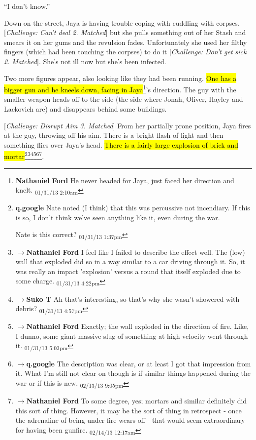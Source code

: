 ``I don't know.''



Down on the street, Jaya is having trouble coping with cuddling with corpses. {[}\textit{Challenge: Can't deal 2.  Matched}{]} but she pulls something out of her Stash and smears it on her gums and the revulsion fades.  Unfortunately she used her filthy fingers (which had been touching the corpses) to do it {[}\textit{Challenge: Don't get sick 2. }\textit{Matched}{]}.  She's not ill now but she's been infected.



Two more figures appear, also looking like they had been running.  \hl{One has a bigger gun and he kneels down, facing in Jaya}\footnote{\textbf{Nathaniel Ford }He never headed for Jaya, just faced her direction and knelt. \textsubscript{01/31/13 2:10am}}'s direction.  The guy with the smaller weapon heads off to the side (the side where Jonah, Oliver, Hayley and Lackovich are) and disappears behind some buildings.



{[}\textit{Challenge: Disrupt Aim 3. Matched}{]} From her partially prone position, Jaya fires at the guy, throwing off his aim.  There is a bright flash of light and then something flies over Jaya's head. \hl{There is a fairly large explosion of brick and mortar}\footnote{\textbf{q.google }Nate noted (I think) that this was percussive not incendiary.  If this is so, I don't think we've seen anything like it, even during the war.

Nate is this correct? \textsubscript{01/31/13 1:37pm}}\footnote{$\rightarrow$\textbf{Nathaniel Ford }I feel like I failed to describe the effect well. The (low) wall that exploded did so in a way similar to a car driving through it. So, it was really an impact 'explosion' versus a round that itself exploded due to some charge. \textsubscript{01/31/13 4:22pm}}\footnote{$\rightarrow$\textbf{Suko T }Ah that's interesting, so that's why she wasn't showered with debris? \textsubscript{01/31/13 4:57pm}}\footnote{$\rightarrow$\textbf{Nathaniel Ford }Exactly; the wall exploded in the direction of fire. Like, I dunno, some giant massive slug of something at high velocity went through it. \textsubscript{01/31/13 5:03pm}}\footnote{$\rightarrow$\textbf{q.google }The description was clear, or at least I got that impression from it.  What I'm still not clear on though is if similar things happened during the war or if this is new. \textsubscript{02/13/13 9:05pm}}\footnote{$\rightarrow$\textbf{Nathaniel Ford }To some degree, yes; mortars and similar definitely did this sort of thing. However, it may be the sort of thing in retrospect - once the adrenaline of being under fire wears off - that would seem extraordinary for having been gunfire. \textsubscript{02/14/13 12:17am}}. 



